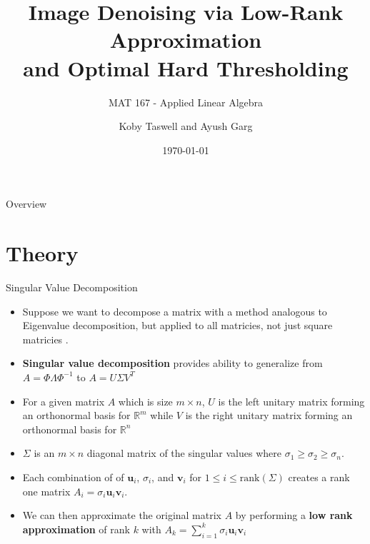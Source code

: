 \documentclass[aspectratio=169,xcolor=dvipsnames]{beamer}
\title[Denoising with SVD]{Image Denoising via Low-Rank Approximation\\ and Optimal Hard Thresholding}
\subtitle{MAT 167 - Applied Linear Algebra}
\author[Taswell and Garg] {Koby Taswell and Ayush Garg}
\institute[UCD] %
{
	University of California, Davis 
	\vskip 3pt
}
\date{\today} %
\renewcommand{\vec}[1]{\mathbf{#1}}
\begin{document}
	
	\begin{frame}
		\titlepage
	\end{frame}
	
	\begin{frame}{Overview}
		\tableofcontents
	\end{frame}
	
	\section{Theory}
	
	\begin{frame}{Singular Value Decomposition}
		\begin{itemize}
			\item Suppose we want to decompose a matrix with a method analogous to Eigenvalue decomposition, but applied to all matricies, not just square matricies \cite{Eckart1936}.
			\item \textbf{Singular value decomposition} provides ability to generalize from $A = \Phi\Lambda\Phi^{-1}$ to $A = U\Sigma V^{T}$
			\item For a given matrix $A$ which is size $m\times n$, $U$ is the left unitary matrix forming an orthonormal basis for $\mathbb{R}^m$  while $V$ is the right unitary matrix forming an orthonormal basis for $\mathbb{R}^n$
			\item $\Sigma$ is an $m\times n$ diagonal matrix of the singular values where $\sigma_1 \geq \sigma_2 \geq \sigma_n$. 
			\item Each combination of of $\vec{u}_i$, $\sigma_i$, and $\vec{v}_i$ for $1\leq i \leq \text{rank}(\Sigma)$ creates a rank one matrix $A_i = \sigma_i\vec{u}_i\vec{v}_i$.
			\item We can then approximate the original matrix $A$ by performing a \textbf{low rank approximation} of rank $k$ with $A_k = \sum_{i=1}^{k}  \sigma_i\vec{u}_i\vec{v}_i$
		\end{itemize}
	\end{frame}
	
\end{document}
